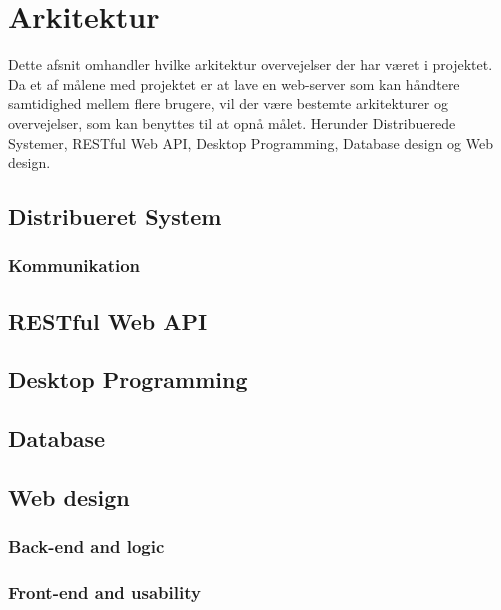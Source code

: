 \chapter{Arkitektur}\label{ch:arkitektur}

Dette afsnit omhandler hvilke arkitektur overvejelser der har været i projektet. Da et af målene med projektet er at lave en web-server som kan håndtere samtidighed mellem flere brugere, vil der være bestemte arkitekturer og overvejelser, som kan benyttes til at opnå målet. Herunder Distribuerede Systemer, RESTful Web API, Desktop Programming, Database design og Web design. 

\section{Distribueret System}\label{sec:distSys}
\subsection{Kommunikation}\label{sec:kommunikation}

\section{RESTful Web API}\label{sec:REST}


\section{Desktop Programming}\label{sec:deskProgramming}


\section{Database}\label{sec:database}


\section{Web design}\label{sec:webdesign}
\subsection{Back-end and logic}\label{sec:backend}
\subsection{Front-end and usability}\label{sec:frontend}
